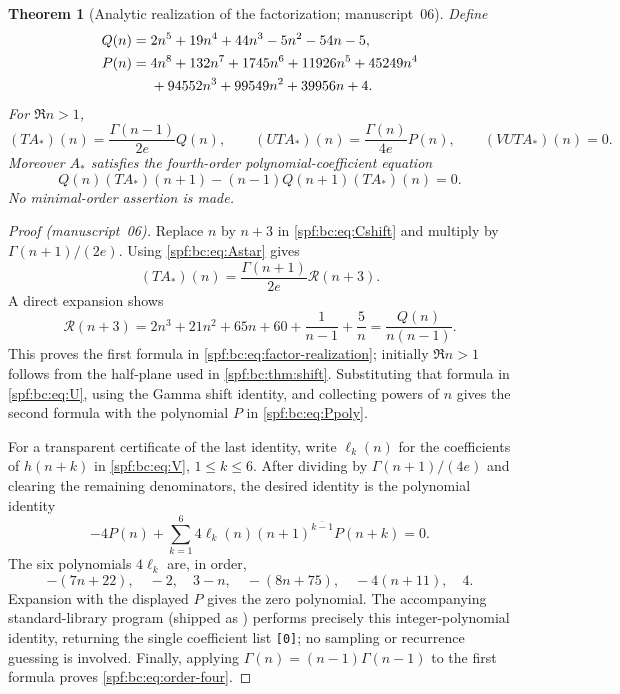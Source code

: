 \documentclass[11pt]{article}
\numberwithin{equation}{section}
\newtheorem{theorem}{Theorem}[section]
\theoremstyle{definition}
\theoremstyle{remark}
\theoremstyle{definition}
\newcommand{\rise}[2]{{#1}^{\overline{#2}}}
\newcommand{\bcA}{A_{\!*}}
\begin{document}
\begin{theorem}[Analytic realization of the factorization; manuscript~06]
\label{spf:bc:thm:operator}
Define
\begin{align}
 Q(n)={}&2n^5+19n^4+44n^3-5n^2-54n-5,\label{spf:bc:eq:Qpoly}\\
 P(n)={}&4n^8+132n^7+1745n^6+11926n^5+45249n^4\notag\\
       &+94552n^3+99549n^2+39956n+4.
 \label{spf:bc:eq:Ppoly}
\end{align}
For $\Re n>1$,
\begin{equation}
 (T\bcA)(n)=\frac{\Gamma(n-1)}{2e}Q(n),\qquad
 (UT\bcA)(n)=\frac{\Gamma(n)}{4e}P(n),\qquad
 (VUT\bcA)(n)=0.
 \label{spf:bc:eq:factor-realization}
\end{equation}
Moreover $\bcA$ satisfies the fourth-order polynomial-coefficient equation
\begin{equation}
 Q(n)(T\bcA)(n+1)-(n-1)Q(n+1)(T\bcA)(n)=0.
 \label{spf:bc:eq:order-four}
\end{equation}
No minimal-order assertion is made.
\end{theorem}

\begin{proof}[Proof (manuscript~06)]
Replace $n$ by $n+3$ in \eqref{spf:bc:eq:Cshift} and multiply by
$\Gamma(n+1)/(2e)$. Using \eqref{spf:bc:eq:Astar} gives
\begin{equation}
 (T\bcA)(n)=\frac{\Gamma(n+1)}{2e}\mathcal R(n+3).
 \label{spf:bc:eq:Tforcing}
\end{equation}
A direct expansion shows
\[
 \mathcal R(n+3)=2n^3+21n^2+65n+60+\frac1{n-1}+\frac5n
               =\frac{Q(n)}{n(n-1)}.
\]
This proves the first formula in \eqref{spf:bc:eq:factor-realization}; initially
$\Re n>1$ follows from the half-plane used in \cref{spf:bc:thm:shift}.
Substituting that formula in \eqref{spf:bc:eq:U}, using the Gamma shift identity,
and collecting powers of $n$ gives the second formula with the polynomial
$P$ in \eqref{spf:bc:eq:Ppoly}.

For a transparent certificate of the last identity, write $\ell_k(n)$ for
the coefficients of $h(n+k)$ in \eqref{spf:bc:eq:V}, $1\le k\le6$. After dividing
by $\Gamma(n+1)/(4e)$ and clearing the remaining denominators, the desired
identity is the polynomial identity
\begin{equation}
 -4P(n)+\sum_{k=1}^6 4\ell_k(n)\rise{(n+1)}{k-1}P(n+k)=0.
 \label{spf:bc:eq:certificate}
\end{equation}
The six polynomials $4\ell_k$ are, in order,
\[
 -(7n+22),\quad-2,\quad3-n,\quad-(8n+75),\quad-4(n+11),\quad4.
\]
Expansion with the displayed $P$ gives the zero polynomial. The accompanying
standard-library program  (shipped as
) performs precisely
this integer-polynomial identity, returning the single coefficient list
\texttt{[0]}; no sampling or recurrence guessing is involved.
Finally, applying $\Gamma(n)=(n-1)\Gamma(n-1)$ to the first formula proves
\eqref{spf:bc:eq:order-four}.
\end{proof}
\end{document}
